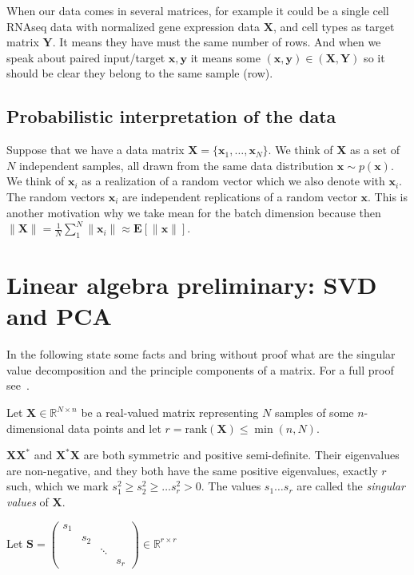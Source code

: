\documentclass[11pt, a4paper]{report}
\theoremstyle{plain}
\theoremstyle{definition}
\theoremstyle{remark}
\newcommand{\R}{\mathbb{R}}
\newcommand{\E}{\mathbf{E}}
\newcommand{\X}{\mathbf{X}}
\newcommand{\x}{\mathbf{x}}
\newcommand{\Y}{\mathbf{Y}}
\newcommand{\y}{\mathbf{y}}
\newcommand{\bv}[1]{\boldsymbol{#1}}
\newcommand{\gt}{>}
\begin{document}
When our data comes in several matrices, for example it could be a single cell RNAseq data
with normalized gene expression data $\X$,  and cell types as target
matrix $\Y$. It means they have must the same number of rows. And when we speak about 
paired input/target $\x,\y$ it means some $(\x,\y) \in (\X,\Y)$ so it should be
clear they belong to the same sample (row).

\subsection{Probabilistic interpretation of the data}
Suppose that we have a data matrix $\X = \{\x_1, \dots , \x_N\}$.
We think of $\X$ as a set of $N$ independent samples, all drawn from the same
data distribution $\x \sim p(\x)$. We think of $\x_i$ as a realization of a
random vector which we also denote with $\x_i$. 
The random vectors $\x_i$ are independent replications of a random vector $\x$.
This is another motivation why we take mean for the batch dimension because
then $\|\X\| = \frac{1}{N} \sum_1^N \|\x_i\| \approx \E [\|\x\|]$.


\section{Linear algebra preliminary: SVD and PCA}
In the following state some facts and bring without proof what are the singular
value decomposition and the principle components of a matrix. For a
full proof see~\cite{serre2001matrices}.

Let $\bv{X} \in \R^{N \times n}$ be a real-valued matrix
representing $N$ samples of some
$n$-dimensional data points and let
$r= \text{rank}(\bv{X}) \leq \min(n,N)$. 

$\X \X^*$ and $\X^* \X$ are both symmetric and positive semi-definite.
Their eigenvalues are non-negative, and they both have
the same positive 
eigenvalues, exactly $r$ such, which we mark
$s_1^2 \geq s_2^2 \geq \dots s_r^2 \gt 0$. The values
$s_1 \dots s_r$ are called the \emph{singular values} of $\bv{X}$.

Let $\bv{S} = 
\begin{pmatrix}
s_1 & & &\\
& s_2 & &\\
& & \ddots &\\
& & & s_r
\end{pmatrix} \in \R^{r \times r}
$
\end{document}
